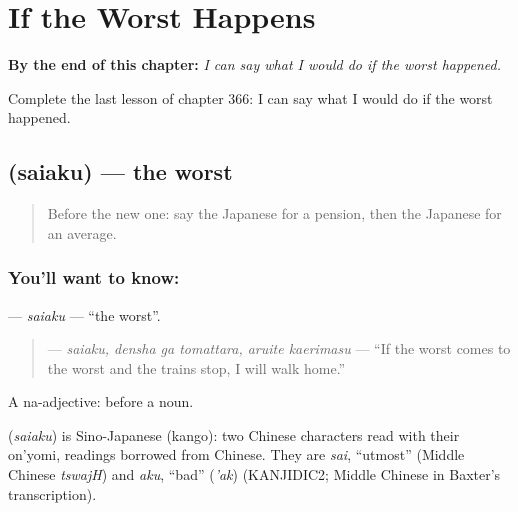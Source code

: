 
\chapter{If the Worst Happens}
\label{ch:ja-if-the-worst-happens}

\begin{chapteropening}
\textbf{By the end of this chapter:} \emph{I can say what I would do if the worst happened.}

Complete the last lesson of chapter 366: I can say what I would do if the worst happened.
\end{chapteropening}

\section[\texorpdfstring{\ja{さいあく} (saiaku)}{さいあく (saiaku)}]{ (saiaku) — the worst}

\label{lesson:JA-C366-saiaku}



\begin{quote}
Before the new one: say the Japanese for a pension, then the Japanese for an average.
\end{quote}

\subsection*{You'll want to know: }
\textbf{} — \emph{saiaku} — \textquotedblleft{}the worst\textquotedblright{}.

\begin{quote}
\textbf{  } — \emph{saiaku, densha ga tomattara, aruite kaerimasu} — \textquotedblleft{}If the worst comes to the worst and the trains stop, I will walk home.\textquotedblright{}
\end{quote}

A na-adjective:  before a noun.

\begin{cousinweb}
\textbf{} (\emph{saiaku}) is Sino-Japanese (kango): two Chinese characters read with their on'yomi, readings borrowed from Chinese. They are \emph{sai}, \textquotedblleft{}utmost\textquotedblright{} (Middle Chinese \emph{tswajH}) and \emph{aku}, \textquotedblleft{}bad\textquotedblright{} (\emph{'ak}) (KANJIDIC2; Middle Chinese in Baxter's transcription).
\end{cousinweb}

